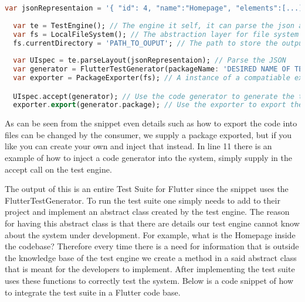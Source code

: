 \begin{lstlisting}[language=dart, caption={How to configure and use the Test Generator Package}]
  var jsonRepresentaion = '{ "id": 4, "name":"Homepage", "elements":[...]}'; //The output from the Mobile application
  
  var te = TestEngine(); // The engine it self, it can parse the json and use a codegenerator
  var fs = LocalFileSystem(); // The abstraction layer for file system
  fs.currentDirectory = 'PATH_TO_OUPUT'; // The path to store the output test suite
  
  var UIspec = te.parseLayout(jsonRepresentaion); // Parse the JSON
  var generator = FlutterTestGenerator(packageName: 'DESIRED NAME OF TEST PACKAGE'); // An instance of a compatiable code generator
  var exporter = PackageExporter(fs); // A instance of a compatiable exporter.

  UIspec.accept(generator); // Use the code generator to generate the test suite
  exporter.export(generator.package); // Use the exporter to export the test suite to the file system.
\end{lstlisting}

As can be seen from the snippet even details such as how to export the code into files can be changed by the consumer, we supply a package exported, but if you like you can create your own and inject that instead. 
In line 11 there is an example of how to inject a code generator into the system, simply supply in the accept call on the test engine.

The output of this is an entire Test Suite for Flutter since the snippet uses the FlutterTestGenerator. 
To run the test suite one simply needs to add to their project and implement an abstract class created by the test engine. 
The reason for having this abstract class is that there are details our test engine cannot know about the system under development.
For example, what is the Homepage inside the codebase?
Therefore every time there is a need for information that is outside the knowledge base of the test engine we create a method in a said abstract class that is meant for the developers to implement. 
After implementing the test suite uses these functions to correctly test the system.
Below is a code snippet of how to integrate the test suite in a Flutter code base.

